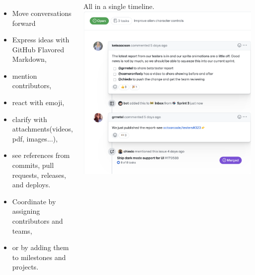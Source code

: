 \begin{frame}
  \frametitle{\insertsectionhead}
  \framesubtitle{\insertsubsectionhead}
  \begin{columns}
    \scriptsize
    \begin{itemize}
      \item Move conversations forward
      \item Express ideas with GitHub Flavored Markdown, 
      \item mention contributors, 
      \item react with emoji, 
      \item clarify with attachments(videos, pdf, images...), 
      \item see references from commits, pull requests, releases, and deploys. 
      \item Coordinate by assigning contributors and teams, 
      \item or by adding them to milestones and projects. 
    \end{itemize}
    \centering\vspace{1cm}
    \alert{All in a single timeline.}
    \includegraphics[width=.9\linewidth]{figures/conversations-1.png}
  \end{columns}

\end{frame}

